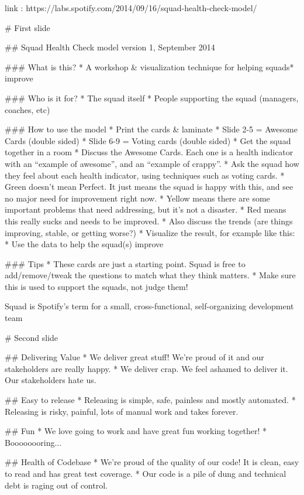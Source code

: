 link : https://labs.spotify.com/2014/09/16/squad-health-check-model/



# First slide

## Squad Health Check model
version 1, September 2014

### What is this?
* A workshop & visualization technique for helping squads* improve

### Who is it for?
* The squad itself
* People supporting the squad (managers, coaches, etc)

### How to use the model
* Print the cards & laminate
  * Slide 2-5 = Awesome Cards (double sided)
  * Slide 6-9 = Voting cards (double sided)
* Get the squad together in a room
* Discuss the Awesome Cards. Each one is a health indicator with an “example of awesome”, and an “example of crappy”. 
* Ask the squad how they feel about each health indicator, using techniques such as voting cards.
  * Green doesn’t mean Perfect. It just means the squad is happy with this, and see no major need for improvement right now.
  * Yellow means there are some important problems that need addressing, but it’s not a disaster.
  * Red means this really sucks and needs to be improved.
* Also discuss the trends (are things improving, stable, or getting worse?)
* Visualize the result, for example like this:
* Use the data to help the squad(s) improve

### Tips
* These cards are just a starting point. Squad is free to add/remove/tweak the questions to match what they think matters.
* Make sure this is used to support the squads, not judge them!

Squad is Spotify’s term for a small, cross-functional, self-organizing development team

# Second slide

## Delivering Value
* We deliver great stuff! We're proud of it and our stakeholders are really happy.
* We deliver crap. We feel ashamed to deliver it. Our stakeholders hate us.

## Easy to release
* Releasing is simple, safe, painless and mostly automated.
* Releasing is risky, painful, lots of manual work and takes forever.

## Fun
* We love going to work and have great fun working together!
* Boooooooring...

## Health of Codebase
* We're proud of the quality of our code! It is clean, easy to read and has great test coverage.
* Our code is a pile of dung and technical debt is raging out of control.

